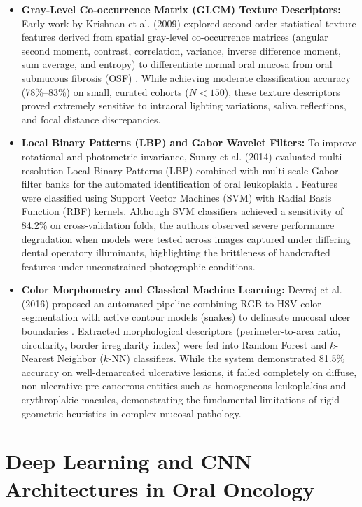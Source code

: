 \documentclass[12pt,a4paper,oneside]{report}
\begin{document}
\begin{itemize}
    \item \textbf{Gray-Level Co-occurrence Matrix (GLCM) Texture Descriptors:} Early work by Krishnan et al. (2009) explored second-order statistical texture features derived from spatial gray-level co-occurrence matrices (angular second moment, contrast, correlation, variance, inverse difference moment, sum average, and entropy) to differentiate normal oral mucosa from oral submucous fibrosis (OSF) \cite{krishnan2009automated}. While achieving moderate classification accuracy (78\%--83\%) on small, curated cohorts ($N < 150$), these texture descriptors proved extremely sensitive to intraoral lighting variations, saliva reflections, and focal distance discrepancies.
    
    \item \textbf{Local Binary Patterns (LBP) and Gabor Wavelet Filters:} To improve rotational and photometric invariance, Sunny et al. (2014) evaluated multi-resolution Local Binary Patterns (LBP) combined with multi-scale Gabor filter banks for the automated identification of oral leukoplakia \cite{sunny2014diagnostic}. Features were classified using Support Vector Machines (SVM) with Radial Basis Function (RBF) kernels. Although SVM classifiers achieved a sensitivity of 84.2\% on cross-validation folds, the authors observed severe performance degradation when models were tested across images captured under differing dental operatory illuminants, highlighting the brittleness of handcrafted features under unconstrained photographic conditions.
    
    \item \textbf{Color Morphometry and Classical Machine Learning:} Devraj et al. (2016) proposed an automated pipeline combining RGB-to-HSV color segmentation with active contour models (snakes) to delineate mucosal ulcer boundaries \cite{devraj2016morphometric}. Extracted morphological descriptors (perimeter-to-area ratio, circularity, border irregularity index) were fed into Random Forest and $k$-Nearest Neighbor ($k$-NN) classifiers. While the system demonstrated 81.5\% accuracy on well-demarcated ulcerative lesions, it failed completely on diffuse, non-ulcerative pre-cancerous entities such as homogeneous leukoplakias and erythroplakic macules, demonstrating the fundamental limitations of rigid geometric heuristics in complex mucosal pathology.
\end{itemize}

\section{Deep Learning and CNN Architectures in Oral Oncology}
\label{sec:deep_learning_oral}
\end{document}
